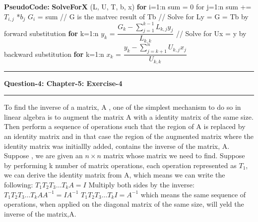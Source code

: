 \documentclass{article}
\newcommand\question[2]{\vspace{.25in}\hrule\textbf{#1: #2}\hrule\vspace{.10in}}
\newcommand\pseudoCode{\vspace{.10in}\textbf{PseudoCode: }}
\begin{document}
\pseudoCode \newline
\hspace*{0.5cm} \textbf {SolveForX} (L, U, T, b, x) \newline
\hspace*{1cm}       \textbf {for} i=1:n \newline
 \hspace*{1.5cm}       sum = 0 \newline
 \hspace*{1.5cm}       for j=1:n \newline
  \hspace*{2cm}              sum +=$ T_{i,j}$ *$ b_{j}$ \newline
 \hspace*{1.5cm}      $G_{i}$ = sum \newline
 \hspace*{1cm}    // G is the matvec result of Tb \newline
 \hspace*{1cm}   // Solve for Ly = G = Tb by forward substitution \newline
 \hspace*{1cm}   \textbf {for} k=1:n \newline
 \hspace*{1.5cm}    $y_{k}$ = $\dfrac{G_{k} - \sum_{j=1}^{k-1}L_{k,j}y_{j}}{L_{k,k}}$ \newline
\hspace*{1cm}  // Solve for Ux = y by backward substitution \newline
\hspace*{1cm}   \textbf {for} k=1:n \newline
\hspace*{1.5cm}   $x_{k}$ = $\dfrac{y_{k} - \sum_{j=k+1}^n U_{k,j}x_{j}}{U_{k,k}}$

  
  \question{Question-4}{Chapter-5: Exercise-4}
To find the inverse of a matrix, A , one of the simplest mechanism to do so in linear algebra is to augment the matrix A with a identity matrix of the same size. Then perform a sequence of operations such that the region of A is replaced by an identity matrix and in that case the region of the augmented matrix where the identity matrix was initiallly added, contains the inverse of the matrix, A. \newline
Suppose , we are given an $n \times n$ matrix whose matrix we need to find. Suppose by performing k number of matrix operations, each operation represented as $T_{1}$, we can derive the identity matrix from A, which means we can write the following: \newline
$T_{1}T_{2}T_{3} \dots T_{k} A = I$ \newline
Multiply both sides by the inverse: \newline
$T_{1}T_{2}T_{3} \dots T_{k} A A^{-1}= IA^{-1}$ \newline
$T_{1}T_{2}T_{3} \dots T_{k} I= A^{-1}$ \newline
which means the same sequence of operations, when applied on the diagonal matrix of the same size, will yeld the inverse of the matrix,A. \newline
\end{document}
